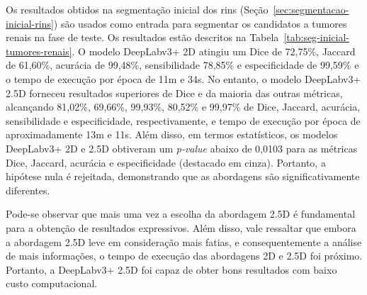 Os resultados obtidos na segmentação inicial dos rins (Seção~\ref{sec:segmentacao-inicial-rins}) são usados como entrada para segmentar os candidatos a tumores renais na fase de teste. Os resultados estão descritos na Tabela~\ref{tab:seg-inicial-tumores-renais}. O modelo DeepLabv3+ 2D atingiu um Dice de 72,75\%, Jaccard de 61,60\%, acurácia de 99,48\%, sensibilidade 78,85\% e especificidade de 99,59\% e o tempo de execução por época de 11m e 34s. No entanto, o modelo DeepLabv3+ 2.5D forneceu resultados superiores de Dice e da maioria das outras métricas, alcançando 81,02\%, 69,66\%, 99,93\%, 80,52\% e 99,97\% de Dice, Jaccard, acurácia, sensibilidade e especificidade, respectivamente, e tempo de execução por época de aproximadamente 13m e 11s. Além disso, em termos estatísticos, os modelos DeepLabv3+ 2D e 2.5D obtiveram um \textit{p-value} abaixo de 0,0103 para as métricas Dice, Jaccard, acurácia e especificidade (destacado em cinza). Portanto, a hipótese nula é rejeitada, demonstrando que as abordagens são significativamente diferentes.

\begin{table}[!ht]
\caption{Resultados da etapa de segmentação de candidatos a tumores renais na região renal.}
\label{tab:seg-inicial-tumores-renais}
\centering
{}
\end{table}

Pode-se observar que mais uma vez a escolha da abordagem 2.5D é fundamental para a obtenção de resultados expressivos. Além disso, vale ressaltar que embora a abordagem 2.5D leve em consideração mais fatias, e consequentemente a análise de mais informações, o tempo de execução das abordagens 2D e 2.5D foi próximo. Portanto, a DeepLabv3+ 2.5D foi capaz de obter bons resultados com baixo custo computacional.

